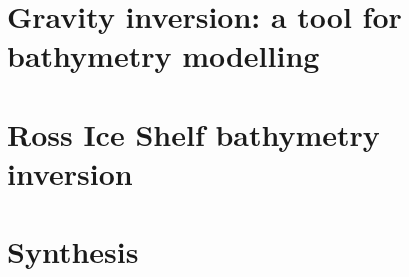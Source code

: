 \documentclass[12pt,twoside]{book}
\begin{document}
\chapter{Gravity inversion: a tool for bathymetry modelling}
\label{ch:3}


\chapter{Ross Ice Shelf bathymetry inversion}
\label{ch:4}


\chapter{Synthesis}
\label{ch:5}


\begin{appendices}
    
\end{appendices}

\printbibliography
\end{document}
